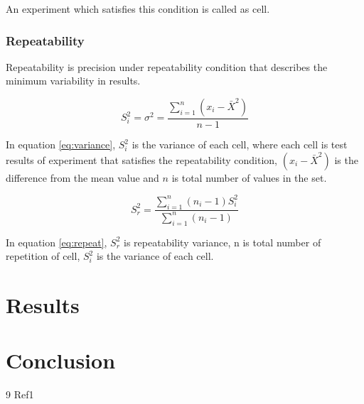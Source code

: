 \documentclass[11pt,a4paper,headinclude,footinclude,chapterprefix=on]{scrreprt}
\begin{document}
An experiment which satisfies this condition is called as cell. 

\subsection{Repeatability}
Repeatability is precision under repeatability condition that describes the minimum variability in results.

\begin{equation}\label{eq:variance}
{S}_i^2 = {\sigma}^2 =  \frac{\sum\limits_{i=1}^{n} (x_{i} - \bar{X}^2)}{n-1}
\end{equation}

In equation \ref{eq:variance},
 $S_{i}^{2}$ is the variance of each cell, where each cell is test results of experiment that satisfies the repeatability condition, $(x_{i} - \bar{X}^2)$ is the difference from the mean value and $n$ is total number of values in the set.

\begin{equation}\label{eq:repeat}
{S}_r^2 = \frac{\sum\limits_{i=1}^{n} (n_{i} - 1){S}_i^2}
{\sum\limits_{i=1}^{n}(n_{i} - 1)}
\end{equation}

In equation \ref{eq:repeat},
${S}_r^2$ is repeatability variance, n is total number of repetition of cell, $S_{i}^{2}$ is the variance of each cell. 


\chapter{Results}

\chapter{Conclusion}

\pagebreak 

\begin{thebibliography}
	{9}  Ref1 
\end{thebibliography}
\end{document}
